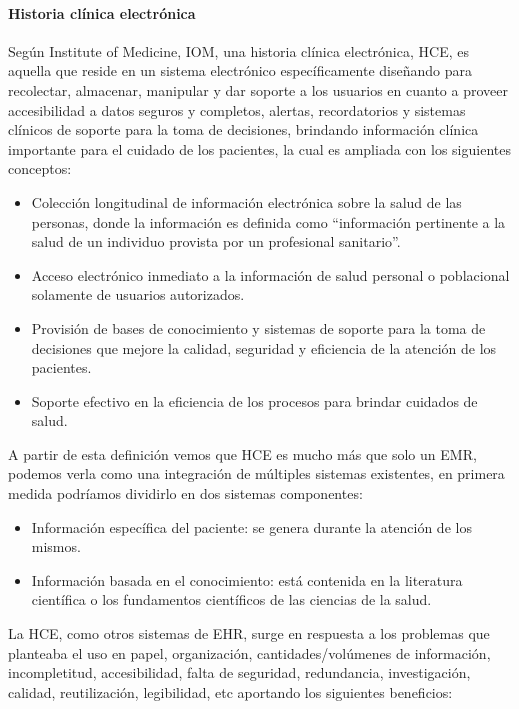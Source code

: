 \paragraph{Historia clínica electrónica}


Según Institute of Medicine, IOM, una historia clínica electrónica, HCE, es aquella que reside en un sistema electrónico específicamente diseñando para recolectar, almacenar, manipular y dar soporte a los usuarios en cuanto a proveer accesibilidad a datos seguros y completos, alertas, recordatorios y sistemas clínicos de soporte para la toma de decisiones, brindando información clínica importante para el cuidado de los pacientes, la cual es ampliada con los siguientes conceptos:
	\begin{itemize}
    \item Colección longitudinal de información electrónica sobre la salud de las personas, donde la información es definida como “información pertinente a la salud de un individuo provista por un profesional sanitario”.
    \item Acceso electrónico inmediato a la información de salud personal o poblacional solamente de usuarios autorizados.
    \item Provisión de bases de conocimiento y sistemas de soporte para la toma de decisiones que mejore la calidad, seguridad y eficiencia de la atención de los pacientes.
    \item Soporte efectivo en la eficiencia de los procesos para brindar cuidados de salud.
    \end{itemize}
   A partir de esta definición vemos que HCE es mucho más que solo un EMR, podemos verla como una integración de múltiples sistemas existentes, en primera medida podríamos dividirlo en dos sistemas componentes: 
	\begin{itemize}
    	\item Información específica del paciente: se genera durante la atención de los mismos.
        \item Información basada en el conocimiento: está contenida en la literatura científica o
los fundamentos científicos de las ciencias de la salud.
	\end{itemize}
    La HCE, como otros sistemas de EHR, surge en respuesta a los problemas que planteaba el uso en papel, organización, cantidades/volúmenes de información, incompletitud, accesibilidad, falta de seguridad, redundancia, investigación, calidad, reutilización, legibilidad, etc aportando los siguientes beneficios:
